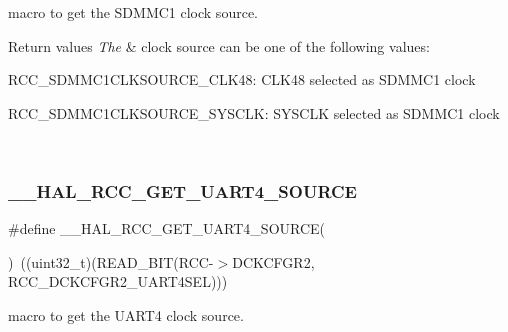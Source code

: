 macro to get the S\+D\+M\+M\+C1 clock source. 


\begin{DoxyRetVals}{Return values}
{\em The} & clock source can be one of the following values\+: \begin{DoxyItemize}
\item R\+C\+C\+\_\+\+S\+D\+M\+M\+C1\+C\+L\+K\+S\+O\+U\+R\+C\+E\+\_\+\+C\+L\+K48\+: C\+L\+K48 selected as S\+D\+M\+M\+C1 clock \item R\+C\+C\+\_\+\+S\+D\+M\+M\+C1\+C\+L\+K\+S\+O\+U\+R\+C\+E\+\_\+\+S\+Y\+S\+C\+LK\+: S\+Y\+S\+C\+LK selected as S\+D\+M\+M\+C1 clock \end{DoxyItemize}
\\
\hline
\end{DoxyRetVals}
\mbox{\label{group___r_c_c_ex___exported___macros_ga91d2925bf5e1d3dad19e77d620591ae0}} 
\subsubsection{\texorpdfstring{\_\_HAL\_RCC\_GET\_UART4\_SOURCE}{\_\_HAL\_RCC\_GET\_UART4\_SOURCE}}
{\footnotesize\ttfamily \#define \+\_\+\+\_\+\+H\+A\+L\+\_\+\+R\+C\+C\+\_\+\+G\+E\+T\+\_\+\+U\+A\+R\+T4\+\_\+\+S\+O\+U\+R\+CE(\begin{DoxyParamCaption}{ }\end{DoxyParamCaption})~((uint32\+\_\+t)(R\+E\+A\+D\+\_\+\+B\+IT(R\+CC-\/$>$D\+C\+K\+C\+F\+G\+R2, R\+C\+C\+\_\+\+D\+C\+K\+C\+F\+G\+R2\+\_\+\+U\+A\+R\+T4\+S\+EL)))}



macro to get the U\+A\+R\+T4 clock source. 



